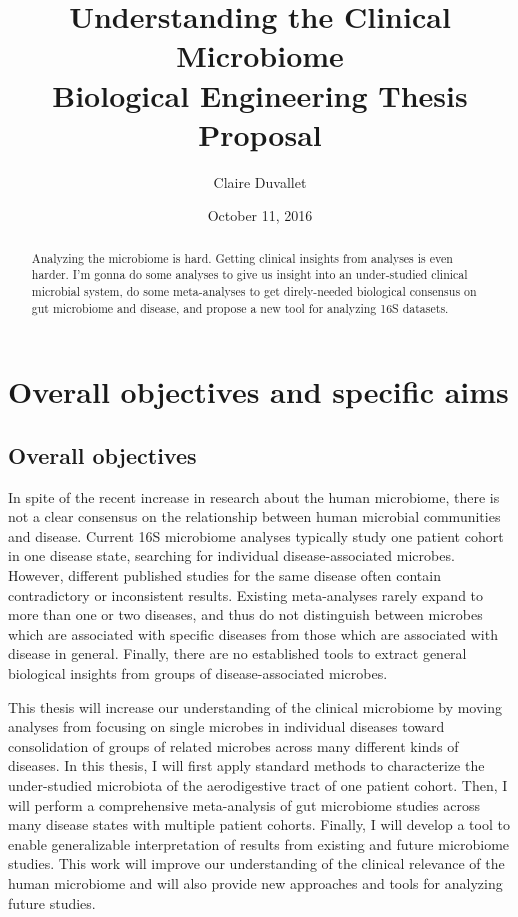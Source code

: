 \documentclass[12pt]{article}
\title{Understanding the Clinical Microbiome \\ Biological Engineering Thesis Proposal}
\author{Claire Duvallet}
\date{October 11, 2016}
\begin{document}
\maketitle
\newpage
\tableofcontents

\begin{abstract}
Analyzing the microbiome is hard. Getting clinical insights from analyses is even harder. I'm gonna do some analyses to give us insight into an under-studied clinical microbial system, do some meta-analyses to get direly-needed biological consensus on gut microbiome and disease, and propose a new tool for analyzing 16S datasets.
\end{abstract}
\newpage

\section{Overall objectives and specific aims}
\subsection{Overall objectives}

In spite of the recent increase in research about the human 
microbiome, there is not a clear consensus on the relationship between 
human microbial communities and disease. Current 16S microbiome 
analyses typically study one patient cohort in one disease state, 
searching for individual disease-associated microbes. However, 
different published studies for the same disease often contain 
contradictory or inconsistent results. Existing meta-analyses rarely 
expand to more than one or two diseases, and thus do not distinguish 
between microbes which are associated with specific diseases from 
those which are associated with disease in general. Finally, there are 
no established tools to extract general biological insights from 
groups of disease-associated microbes.

This thesis will increase our understanding of the clinical microbiome 
by moving analyses from focusing on single microbes in individual 
diseases toward consolidation of groups of related microbes across 
many different kinds of diseases. In this thesis, I will first apply 
standard methods to characterize the under-studied microbiota of the 
aerodigestive tract of one patient cohort. Then, I will perform a 
comprehensive meta-analysis of gut microbiome studies across many 
disease states with multiple patient cohorts. Finally, I will develop 
a tool to enable generalizable interpretation of results from existing 
and future microbiome studies. This work will improve our 
understanding of the clinical relevance of the human microbiome and 
will also provide new approaches and tools for analyzing future 
studies.
\end{document}
